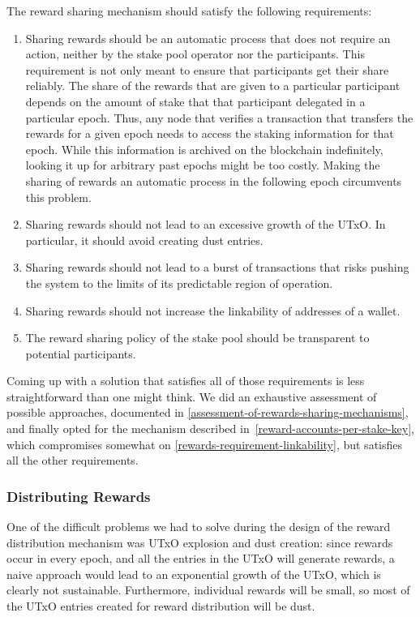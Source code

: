 \documentclass[11pt,a4paper]{article}
\begin{document}
The reward sharing mechanism should satisfy the following requirements:

\begin{enumerate}
\item
  Sharing rewards should be an automatic process that does not require
  an action, neither by the stake pool operator nor the participants.
  This requirement is not only meant to ensure that participants get
  their share reliably. The share of the rewards that are given to a
  particular participant depends on the amount of stake that that
  participant delegated in a particular epoch. Thus, any node that
  verifies a transaction that transfers the rewards for a given epoch
  needs to access the staking information for that epoch. While this
  information is archived on the blockchain indefinitely, looking it up
  for arbitrary past epochs might be too costly. Making the sharing of
  rewards an automatic process in the following epoch circumvents this
  problem.
\item
  Sharing rewards should not lead to an excessive growth of the UTxO. In
  particular, it should avoid creating dust entries.
\item
  Sharing rewards should not lead to a burst of transactions that risks
  pushing the system to the limits of its predictable region of
  operation.
\item\label{rewards-requirement-linkability}
  Sharing rewards should not increase the linkability of addresses of a
  wallet.
\item
  The reward sharing policy of the stake pool should be transparent to
  potential participants.
\end{enumerate}

Coming up with a solution that satisfies all of those requirements is
less straightforward than one might think. We did an exhaustive
assessment of possible approaches, documented in
\cref{assessment-of-rewards-sharing-mechanisms}, and finally opted for
the mechanism described in~\ref{reward-accounts-per-stake-key}, which
compromises somewhat on \cref{rewards-requirement-linkability}, but
satisfies all the other requirements.

\subsubsection{Distributing Rewards}
\label{distributing-rewards}

One of the difficult problems we had to solve during the design of the
reward distribution mechanism was UTxO explosion and dust creation:
since rewards occur in every epoch, and all the entries in the UTxO
will generate rewards, a naive approach would lead to an exponential
growth of the UTxO, which is clearly not sustainable. Furthermore,
individual rewards will be small, so most of the UTxO entries created
for reward distribution will be dust.
\end{document}
